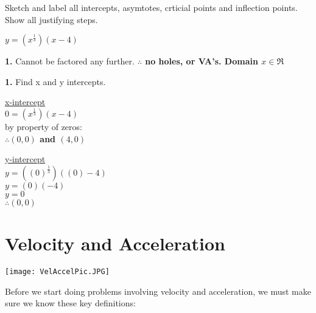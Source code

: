 \documentclass[12pt,fleqn]{book} %
\begin{document}
\noindent Sketch and label all intercepts, asymtotes, crticial points and inflection points. Show all justifying steps.

\vspace*{2mm}

{\large $y=(x^\frac{1}{3})(x-4)$}

\vspace*{4mm}

\noindent \textbf{1.} Cannot be factored any further. \textbf{$\therefore$ no holes, or VA's. Domain $x \in \Re$} \\

\vspace*{-2mm}

\noindent \textbf{1.} Find x and y intercepts.

\vspace*{-4mm}

\begin{multicols}{2}
    \begin{center}
        \underline{x-intercept} \\
        $0=(x^\frac{1}{3})(x-4)$\\
        by property of zeros: \\
        \textbf{$\therefore (0, 0)$ and $(4, 0)$}

        \columnbreak

        \underline{y-intercept} \\
        $y=((0)^\frac{1}{3})((0)-4)$ \\
        $y=(0)(-4)$ \\
        $y=0$ \\
        \textbf{$\therefore (0, 0)$}
        \columnbreak
    \end{center}
\end{multicols}



\section{Velocity and Acceleration}

\texttt{[image: VelAccelPic.JPG]}

\noindent Before we start doing problems involving velocity and acceleration, we must make sure we know these key definitions:

\vspace*{2mm}
\end{document}
